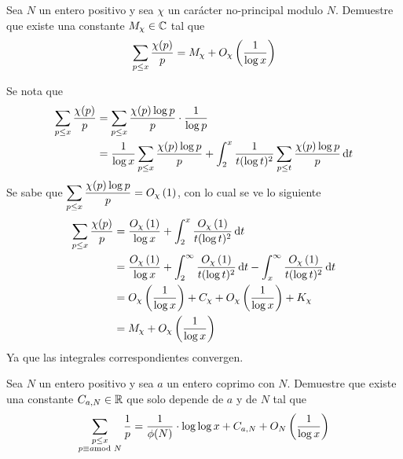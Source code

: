 \begin{prob}[7 pts.]
	Sea $N$ un entero positivo y sea $\chi$ un carácter no-principal modulo $N$. Demuestre que existe una constante $M_\chi\in\set{C}$ tal que
	\[\sum_{p\leq x}\frac{\chi(p)}{p}=M_\chi+\BigO[\chi]{\frac1{\log x}}\]
\end{prob}

\begin{sol}
	Se nota que
	\begin{align*}
		\sum_{p\leq x}\frac{\chi(p)}{p} & =\sum_{p\leq x}\frac{\chi(p)\log p}{p}\cdot \frac{1}{\log p}                                                               \\
		                                & =\frac1{\log x}\sum_{p\leq x}\frac{\chi(p)\log p}{p}+\int_2^x\frac1{t(\log t)^2}\sum_{p\leq t}\frac{\chi(p)\log p}{p}\d{t}
	\end{align*}
	Se sabe que $\ds \sum_{p\leq x}\frac{\chi(p)\log p}{p}=\BigO[\chi]{1}$, con lo cual se ve lo siguiente
	\begin{align*}
		\sum_{p\leq x}\frac{\chi(p)}{p} & =\frac{\BigO[\chi]{1}}{\log x}+\int_2^x\frac{\BigO[\chi]{1}}{t(\log t)^2}\d{t}                                                           \\
		                                & =\frac{\BigO[\chi]{1}}{\log x}+\int_2^\infty\frac{\BigO[\chi]{1}}{t(\log t)^2}\d{t}-\int_x^\infty\frac{\BigO[\chi]{1}}{t(\log t)^2}\d{t} \\
		                                & =\BigO[\chi]{\frac1{\log x}}+C_\chi+\BigO[\chi]{\frac1{\log x}}+K_\chi                                                                   \\
		                                & =M_\chi + \BigO[\chi]{\frac1{\log x}}
	\end{align*}
	Ya que las integrales correspondientes convergen.
\end{sol}

\begin{prob}
	Sea $N$ un entero positivo y sea $a$ un entero coprimo con $N$. Demuestre que existe una constante $C_{a,N}\in\set{R}$ que solo depende de $a$ y de $N$ tal que
	\[\sum_{\substack{p\leq x\\ p\equiv a\!\!\!\!\mod N}}\frac1p=\frac1{\phi(N)}\cdot\log\log x+C_{a,N}+\BigO[N]{\frac1{\log x}}\]
\end{prob}

